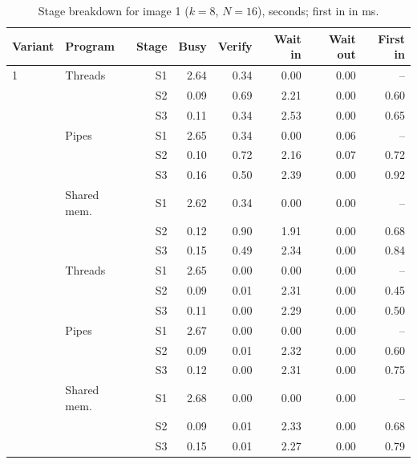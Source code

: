 \documentclass[11pt,a4paper]{article}
\newcommand{\cfgK}{8}
\newcommand{\cfgRing}{16}
\begin{document}
\begin{table}[htbp]
\centering
\caption{Stage breakdown for image 1 ($k=\cfgK$, $N=\cfgRing$), seconds; first in in ms.}
\label{tab:stages1}
\begin{tabular}{llrrrrrr}
\toprule
Variant & Program & Stage & Busy & Verify & Wait in & Wait out & First in \\
\midrule
1 & Threads & S1 & 2.64 & 0.34 & 0.00 & 0.00 & -- \\
 &  & S2 & 0.09 & 0.69 & 2.21 & 0.00 & 0.60 \\
 &  & S3 & 0.11 & 0.34 & 2.53 & 0.00 & 0.65 \\
\addlinespace
1 & Pipes & S1 & 2.65 & 0.34 & 0.00 & 0.06 & -- \\
 &  & S2 & 0.10 & 0.72 & 2.16 & 0.07 & 0.72 \\
 &  & S3 & 0.16 & 0.50 & 2.39 & 0.00 & 0.92 \\
\addlinespace
1 & Shared mem. & S1 & 2.62 & 0.34 & 0.00 & 0.00 & -- \\
 &  & S2 & 0.12 & 0.90 & 1.91 & 0.00 & 0.68 \\
 &  & S3 & 0.15 & 0.49 & 2.34 & 0.00 & 0.84 \\
\addlinespace
2 & Threads & S1 & 2.65 & 0.00 & 0.00 & 0.00 & -- \\
 &  & S2 & 0.09 & 0.01 & 2.31 & 0.00 & 0.45 \\
 &  & S3 & 0.11 & 0.00 & 2.29 & 0.00 & 0.50 \\
\addlinespace
2 & Pipes & S1 & 2.67 & 0.00 & 0.00 & 0.00 & -- \\
 &  & S2 & 0.09 & 0.01 & 2.32 & 0.00 & 0.60 \\
 &  & S3 & 0.12 & 0.00 & 2.31 & 0.00 & 0.75 \\
\addlinespace
2 & Shared mem. & S1 & 2.68 & 0.00 & 0.00 & 0.00 & -- \\
 &  & S2 & 0.09 & 0.01 & 2.33 & 0.00 & 0.68 \\
 &  & S3 & 0.15 & 0.01 & 2.27 & 0.00 & 0.79 \\
\bottomrule
\end{tabular}
\end{table}
\end{document}
